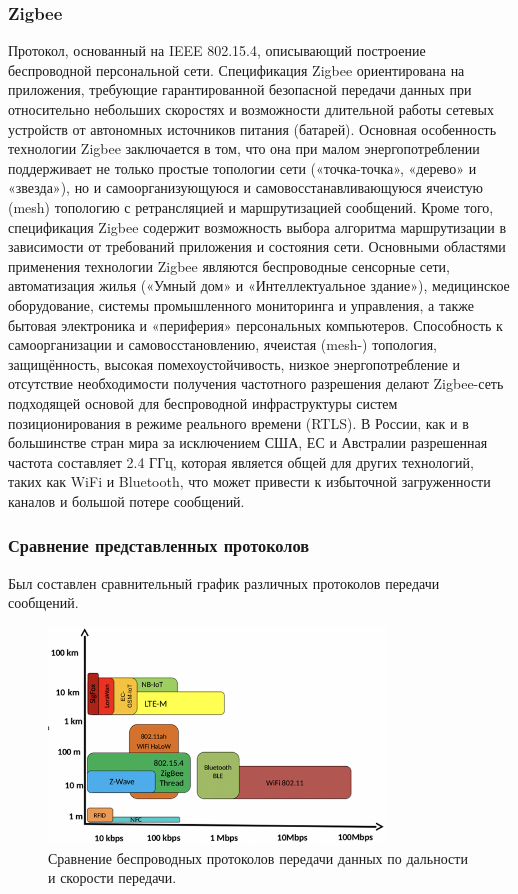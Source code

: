 \documentclass[a4paper,12pt]{article}
\begin{document}
\subsubsection{Zigbee}
Протокол, основанный на IEEE 802.15.4, описывающий построение беспроводной персональной сети. Спецификация Zigbee ориентирована на приложения, требующие гарантированной безопасной передачи данных при относительно небольших скоростях и возможности длительной работы сетевых устройств от автономных источников питания (батарей). Основная особенность технологии Zigbee заключается в том, что она при малом энергопотреблении поддерживает не только простые топологии сети («точка-точка», «дерево» и «звезда»), но и самоорганизующуюся и самовосстанавливающуюся ячеистую (mesh) топологию с ретрансляцией и маршрутизацией сообщений. Кроме того, спецификация Zigbee содержит возможность выбора алгоритма маршрутизации в зависимости от требований приложения и состояния сети.
Основными областями применения технологии Zigbee являются беспроводные сенсорные сети, автоматизация жилья («Умный дом» и «Интеллектуальное здание»), медицинское оборудование, системы промышленного мониторинга и управления, а также бытовая электроника и «периферия» персональных компьютеров.
Способность к самоорганизации и самовосстановлению, ячеистая (mesh-) топология, защищённость, высокая помехоустойчивость, низкое энергопотребление и отсутствие необходимости получения частотного разрешения делают Zigbee-сеть подходящей основой для беспроводной инфраструктуры систем позиционирования в режиме реального времени (RTLS).
В России, как и в большинстве стран мира за исключением США, ЕС и Австралии разрешенная частота составляет 2.4 ГГц, которая является общей для других технологий, таких как WiFi и Bluetooth, что может привести к избыточной загруженности каналов и большой потере сообщений.

\subsubsection{Сравнение представленных протоколов}
Был составлен сравнительный график различных протоколов передачи сообщений.\

\begin{figure}[h]
    \centering
    \includegraphics[width=0.8\textwidth]{images/Fig07.png}
    \caption{Сравнение беспроводных протоколов передачи данных по дальности и скорости передачи.}
    \label{fig:protocols_range_vs_speed}
\end{figure}
\end{document}
